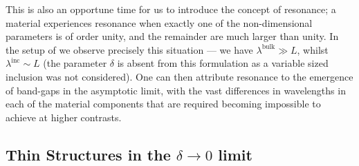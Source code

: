This is also an opportune time for us to introduce the concept of resonance; a material experiences resonance when exactly one of the non-dimensional parameters is of order unity, and the remainder are much larger than unity.
In the setup of \cite{hempel2000spectral} we observe precisely this situation --- we have $\lambda^{\mathrm{bulk}}\gg L$, whilst $\lambda^{\mathrm{inc}}\sim L$ (the parameter $\delta$ is absent from this formulation as a variable sized inclusion was not considered).
One can then attribute resonance to the emergence of band-gaps  in the asymptotic limit, with the vast differences in wavelengths in each of the material components that are required becoming impossible to achieve at higher contrasts.


\subsection{Thin Structures in the $\delta\rightarrow0$ limit}

